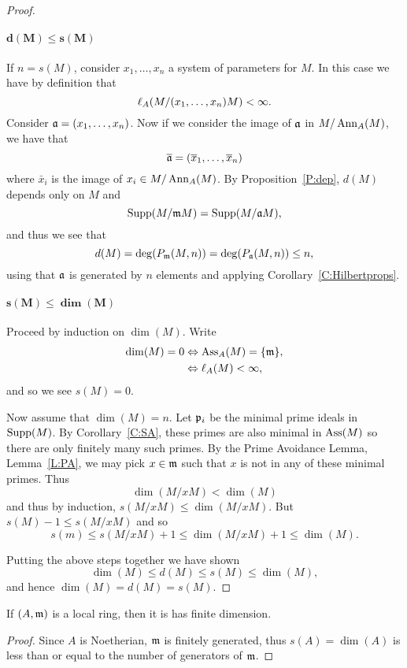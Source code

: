 \documentclass{ximera}
\begin{document}
\begin{proof}
\paragraph{$\boldsymbol{d(M)\le s(M)}$} If $n =s(M)$, consider $x_1,\dots,x_n$ a system of parameters for $M$. In this case we have by definition that 
\[
\ell_A(M/(x_1,\dots,x_n)M)<\infty.
\] 
Consider $\mathfrak{a} = (x_1,\dots,x_n)$. Now if we consider the image of $\mathfrak{a}$ in $M/\operatorname{Ann}_A(M)$, we have that
\[
\overline{\mathfrak{a}} = (\overline{x}_1, \dots, \overline{x}_n)
\]
where $\bar{x}_i$ is the image of $x_i\in M/\operatorname{Ann}_A(M)$. By Proposition~\ref{P:dep}, $d(M)$ depends only on $M$ and
\[
\operatorname{Supp}(M/\mathfrak{m} M) =\operatorname{Supp}(M/\mathfrak{a} M),
\]
and thus we see that 
\[
d(M) = \deg(P_{\mathfrak{m}}(M,n)) = \deg(P_{\mathfrak{a}}(M,n))\le n,
\]
using that $\mathfrak{a}$ is generated by $n$ elements and applying Corollary~\ref{C:Hilbertprops}.



\paragraph{$\boldsymbol{s(M)\le\dim(M)}$} Proceed by induction on $\dim(M)$. Write
\begin{align*}
\dim(M) = 0 &\Leftrightarrow \operatorname{Ass}_A(M)=\{\mathfrak{m}\}, \\
&\Leftrightarrow \ell_A(M) <\infty,
\end{align*}
and so we see $s(M) = 0$.

Now assume that $\dim(M)=n$. Let $\mathfrak{p}_i$ be the minimal prime ideals in $\operatorname{Supp}(M)$. By Corollary~\ref{C:SA}, these primes are also minimal in $\operatorname{Ass}(M)$ so there are only finitely many such primes. By the Prime Avoidance Lemma, Lemma~\ref{L:PA}, we may pick $x\in\mathfrak{m}$ such that $x$ is not in any of these minimal primes. Thus
\[
\dim(M/xM) <\dim(M)
\]
and thus by induction, $s(M/xM)\le\dim(M/xM)$. But $s(M)-1\le s(M/xM)$ and so
\[
s(m) \le s(M/xM) +1 \le \dim(M/xM) +1 \le \dim(M).
\]

Putting the above steps together we have shown 
\[
\dim(M)\le d(M) \le s(M) \le \dim(M),
\]
and hence $\dim(M) = d(M) = s(M)$.
\end{proof}


\begin{corollary} If $(A,\mathfrak{m})$ is a local ring, then it is has finite dimension.
\end{corollary}

\begin{proof} Since $A$ is Noetherian, $\mathfrak{m}$ is finitely generated, thus $s(A)=\dim(A)$ is less than or equal to the number of generators of $\mathfrak{m}$.
\end{proof}
\end{document}
